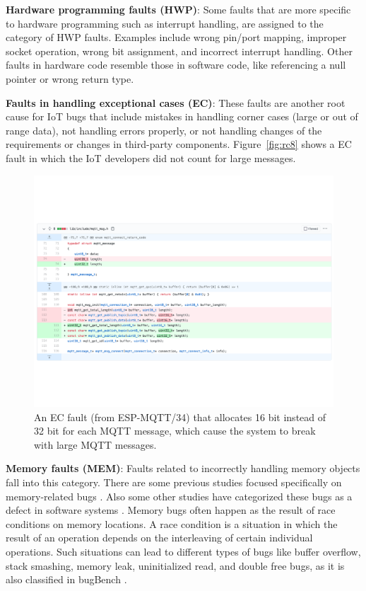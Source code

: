 \textbf{Hardware programming faults (HWP)}: Some faults that are more specific to hardware programming such as interrupt handling, are assigned to the category of HWP faults. Examples include wrong pin/port mapping, improper socket operation, wrong bit assignment, and incorrect interrupt handling. Other faults in hardware code resemble those in software code, like referencing a null pointer or wrong return type.

\textbf{Faults in handling exceptional cases (EC)}: These faults are another root cause for IoT bugs that include mistakes in handling corner cases (large or out of range data), not handling errors properly, or not handling changes of the requirements or changes in third-party components. Figure~\autoref{fig:rc8} shows a EC fault in which the IoT developers did not count for large messages.
 
 \begin{figure}%
  \centering
   \includegraphics[width=\linewidth]{imgs/rc8}
  \caption{An EC fault (from ESP-MQTT/34) that allocates 16 bit instead of 32 bit for each MQTT message, which cause the system to break with large MQTT messages.}
  \label{fig:rc8}
\end{figure}
 
\textbf{Memory faults (MEM)}: Faults related to incorrectly handling memory objects fall into this category. There are some previous studies focused specifically on memory-related bugs \cite{memBugs}. Also some other studies have categorized these bugs as a defect in software systems \cite{openSourceBugs}. Memory bugs often happen as the result of race conditions on memory locations. A race condition is a situation in which the result of an operation depends on the interleaving of certain individual operations. Such situations can lead to different types of bugs like buffer overflow, stack smashing, memory leak, uninitialized read, and double free bugs, as it is also classified in bugBench \cite{bugBench}.

